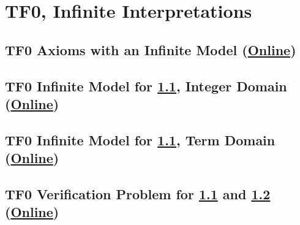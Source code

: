 \documentclass{easychair}
\begin{document}
\newpage
\section{TF0, Infinite Interpretations}
\label{TF0Infinite}

\subsection{TF0 Axioms with an Infinite Model
(\href{https://raw.githubusercontent.com/GeoffsPapers/InterpretationFormat/master/Examples/TFF_Infinite.p}{Online})}
\label{TFF_Infinite.p}
\begin{small}

\end{small}

\newpage
\subsection{TF0 Infinite Model for \ref{TFF_Infinite.p}, Integer Domain
(\href{https://raw.githubusercontent.com/GeoffsPapers/InterpretationFormat/master/Examples/TFF_Integer.s}{Online})}
\label{TFF_Integer.s}
\begin{small}

\end{small}

\newpage
\subsection{TF0 Infinite Model for \ref{TFF_Infinite.p}, Term Domain
(\href{https://raw.githubusercontent.com/GeoffsPapers/InterpretationFormat/master/Examples/TFF_Peano.s}{Online})}
\label{TFF_Peano.s}
\begin{small}

\end{small}

\newpage
\subsection{TF0 Verification Problem for \ref{TFF_Infinite.p} and \ref{TFF_Integer.s}
(\href{https://raw.githubusercontent.com/GeoffsPapers/InterpretationFormat/master/Examples/TFF_Integer.s.p}{Online})}
\label{TFF_Integer.s.p}
\begin{small}

\end{small}
\end{document}
